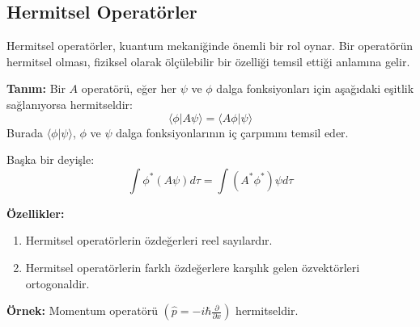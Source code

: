 \documentclass[11pt,letterpaper]{article}
\begin{document}
\subsection*{Hermitsel Operatörler}

Hermitsel operatörler, kuantum mekaniğinde önemli bir rol oynar. Bir operatörün hermitsel olması, fiziksel olarak ölçülebilir bir özelliği temsil ettiği anlamına gelir.

\textbf{Tanım:}
Bir $A$ operatörü, eğer her $\psi$ ve $\phi$ dalga fonksiyonları için aşağıdaki eşitlik sağlanıyorsa hermitseldir:
\[
\langle \phi | A \psi \rangle = \langle A \phi | \psi \rangle
\]
Burada $\langle \phi | \psi \rangle$, $\phi$ ve $\psi$ dalga fonksiyonlarının iç çarpımını temsil eder.

Başka bir deyişle:
\[
\int \phi^* (A \psi) d\tau = \int (A^* \phi^*) \psi d\tau
\]

\textbf{Özellikler:}
\begin{enumerate}
    \item Hermitsel operatörlerin özdeğerleri reel sayılardır.
    \item Hermitsel operatörlerin farklı özdeğerlere karşılık gelen özvektörleri ortogonaldir.
\end{enumerate}

\textbf{Örnek:}
Momentum operatörü $(\hat{p} = -i\hbar \frac{\partial}{\partial x})$ hermitseldir.
\end{document}
